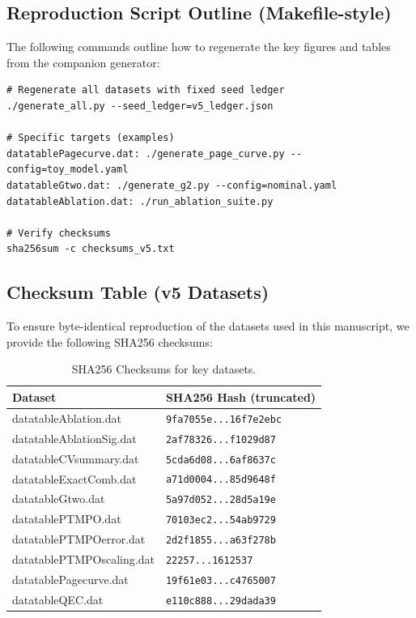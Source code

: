 \documentclass[11pt,a4paper]{article}
\theoremstyle{plain}
\theoremstyle{definition}
\theoremstyle{remark}
\begin{document}
\subsection{Reproduction Script Outline (Makefile-style)}
The following commands outline how to regenerate the key figures and tables from the companion generator:
\begin{verbatim}
# Regenerate all datasets with fixed seed ledger
./generate_all.py --seed_ledger=v5_ledger.json

# Specific targets (examples)
datatablePagecurve.dat: ./generate_page_curve.py --config=toy_model.yaml
datatableGtwo.dat: ./generate_g2.py --config=nominal.yaml
datatableAblation.dat: ./run_ablation_suite.py

# Verify checksums
sha256sum -c checksums_v5.txt
\end{verbatim}

\subsection{Checksum Table (v5 Datasets)}
To ensure byte-identical reproduction of the datasets used in this manuscript, we provide the following SHA256 checksums:
\begin{table}[h]
\centering
\caption{SHA256 Checksums for key datasets.}
\label{tab:checksums}
\footnotesize
\begin{tabular*}{\textwidth}{@{\extracolsep{\fill}}ll@{}}
\toprule
\textbf{Dataset} & \textbf{SHA256 Hash (truncated)} \\
\midrule
datatableAblation.dat & {\tiny\texttt{9fa7055e...16f7e2ebc}} \\
datatableAblationSig.dat & {\tiny\texttt{2af78326...f1029d87}} \\
datatableCVsummary.dat & {\tiny\texttt{5cda6d08...6af8637c}} \\
datatableExactComb.dat & {\tiny\texttt{a71d0004...85d9648f}} \\
datatableGtwo.dat & {\tiny\texttt{5a97d052...28d5a19e}} \\
datatablePTMPO.dat & {\tiny\texttt{70103ec2...54ab9729}} \\
datatablePTMPOerror.dat & {\tiny\texttt{2d2f1855...a63f278b}} \\
datatablePTMPOscaling.dat & {\tiny\texttt{22257...1612537}} \\
datatablePagecurve.dat & {\tiny\texttt{19f61e03...c4765007}} \\
datatableQEC.dat & {\tiny\texttt{e110c888...29dada39}} \\
\bottomrule
\end{tabular*}
\end{table}
\end{document}
